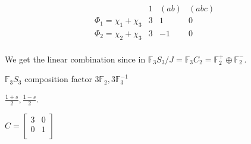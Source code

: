 \documentclass{article}
\theoremstyle{definition}
\begin{document}
\[
    \begin{array}{cccc}
         & 1 & (ab) & (abc)\\
    \Phi_1=\chi_1 + \chi_3 & 3 & 1 & 0 \\
    \Phi_2=\chi_2 + \chi_3 & 3 & -1 & 0 \\
    
    \end{array}
\]

We get the linear combination since in \(\mathbb{F}_3 S_3 / J =\mathbb{F} _3 C_2 = \mathbb{F}_2^+ \oplus \mathbb{F}_2^-\).


\(\mathbb{F}_3 S_3\) composition factor \(3 \mathbb{F}_2, 3 \mathbb{F}_3^{-1}\)

\(\frac{1+s}{2}, \frac{1-s}{2}\).

\(C = \begin{bmatrix}
    3 & 0\\
    0 & 1\\
\end{bmatrix}\) 
\end{document}
